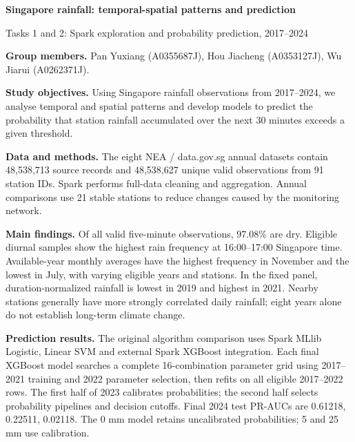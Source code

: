 \documentclass[UTF8,fontset=fandol,10pt,a4paper,landscape]{ctexart}
\begin{document}
{\LARGE\bfseries\color{ink} Singapore rainfall: temporal-spatial patterns and prediction}\par
{\large Tasks 1 and 2: Spark exploration and probability prediction, 2017--2024}\par
\vspace{2mm}

\textbf{Group members.} Pan Yuxiang (A0355687J), Hou Jiacheng (A0353127J), Wu Jiarui (A0262371J).

\textbf{Study objectives.} Using Singapore rainfall observations from 2017--2024, we analyse temporal and spatial patterns and develop models to predict the probability that station rainfall accumulated over the next 30 minutes exceeds a given threshold.

\textbf{Data and methods.} The eight NEA / data.gov.sg annual datasets contain 48,538,713 source records and 48,538,627 unique valid observations from 91 station IDs. Spark performs full-data cleaning and aggregation. Annual comparisons use 21 stable stations to reduce changes caused by the monitoring network.

\textbf{Main findings.} Of all valid five-minute observations, 97.08\% are dry. Eligible diurnal samples show the highest rain frequency at 16:00--17:00 Singapore time. Available-year monthly averages have the highest frequency in November and the lowest in July, with varying eligible years and stations. In the fixed panel, duration-normalized rainfall is lowest in 2019 and highest in 2021. Nearby stations generally have more strongly correlated daily rainfall; eight years alone do not establish long-term climate change.

\textbf{Prediction results.} The original algorithm comparison uses Spark MLlib Logistic, Linear SVM and external Spark XGBoost integration. Each final XGBoost model searches a complete 16-combination parameter grid using 2017--2021 training and 2022 parameter selection, then refits on all eligible 2017--2022 rows. The first half of 2023 calibrates probabilities; the second half selects probability pipelines and decision cutoffs. Final 2024 test PR-AUCs are 0.61218, 0.22511, 0.02118. The 0 mm model retains uncalibrated probabilities; 5 and 25 mm use calibration.
\end{document}

